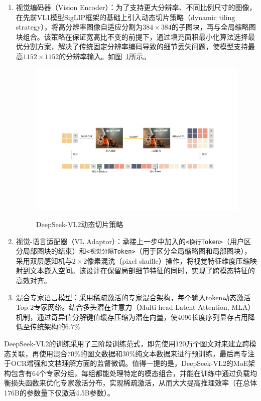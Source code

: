 \begin{enumerate}
    \item 视觉编码器（Vision Encoder）：为了支持更大分辨率、不同比例尺寸的图像，在先前VL1模型SigLIP框架的基础上引入动态切片策略（dynamic tiling strategy），将高分辨率图像自适应分割为$384\times384$的子图块，再与全局缩略图块组合。该策略在保证宽高比不变的前提下，通过填充面积最小化算法选择最优分割方案，解决了传统固定分辨率编码导致的细节丢失问题，使模型支持最高$1152\times1152$的分辨率输入。如图~\ref{fig:deepseek_vl2_cropping_strategy}所示。
    \begin{figure}[ht]
        \centering
        \includegraphics[width=1\textwidth]
        {figures/deepseek_vl2_cropping_strategy.pdf}\\
        \caption{DeepSeek-VL2动态切片策略\cite{wuDeepSeekVL2MixtureofExpertsVisionLanguage2024}}
        \label{fig:deepseek_vl2_cropping_strategy} %
    \end{figure}
    \item 视觉-语言适配器（VL Adaptor）：承接上一步中加入的\verb|<换行Token>|（用户区分局部图块的结束）和\verb|<视觉分隔Token>|（用于区分全局缩略图和局部图块），采用双层感知机与$2\times2$像素混洗（pixel shuffle）操作，将视觉特征维度压缩映射到文本嵌入空间。该设计在保留局部细节特征的同时，实现了跨模态特征的高效对齐。
    \item 混合专家语言模型：采用稀疏激活的专家混合架构，每个输入token动态激活Top-2专家网络。结合多头潜在注意力（Multi-head Latent Attention, MLA）机制，通过奇异值分解键值缓存压缩为潜在向量，使4096长度序列显存占用降低至传统架构的$6.7\%$
\end{enumerate}

DeepSeek-VL2的训练采用了三阶段训练范式，即先使用120万个图文对来建立跨模态关联，再使用混合$70\%$的图文数据和$30\%$纯文本数据来进行预训练，最后再专注于OCR增强和文档理解方面的监督微调。值得一提的是，DeepSeek-VL2的MoE架构包含有64个专家分组，每组都能处理特定的模态组合，并能在训练中通过负载均衡损失函数来优化专家激活分布，实现稀疏激活，从而大大提高推理效率（在总体176B的参数量下仅激活4.5B参数）。


